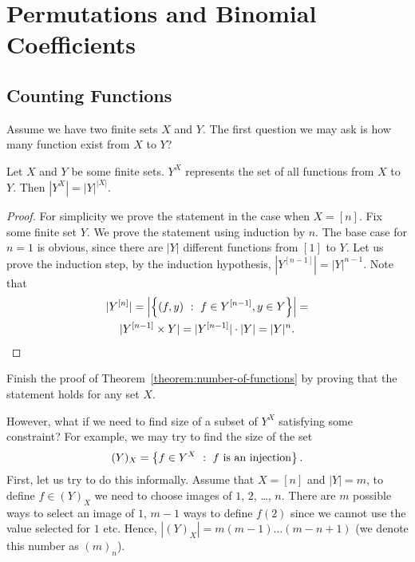 \chapter{Permutations and Binomial Coefficients}
\section{Counting Functions}
Assume we have two finite sets $X$ and $Y$. The first question we may ask is
how many function exist from $X$ to $Y$?


\begin{theorem}
\label{theorem:number-of-functions}
  Let $X$ and $Y$ be some finite sets. $Y^X$ represents the set of all
  functions from $X$ to $Y$. Then $|Y^X| = |Y|^{|X|}$.
\end{theorem}
\begin{proof}
  For simplicity we prove the statement in the case when $X = [n]$. Fix some
  finite set $Y$. We prove the statement using induction by $n$. The base case
  for $n = 1$ is obvious, since there are $|Y|$ different functions from $[1]$
  to $Y$. Let us prove the induction step, by the induction hypothesis,
  $|Y^{[n - 1]}| = |Y|^{n - 1}$. Note that
  \begin{multline*}
    |Y^{[n]}| = \left| \set[f \in Y^{[ n - 1]}, y \in Y]{(f, y)} \right| = \\
    |Y^{[n - 1]} \times Y| = |Y^{[n - 1]}| \cdot |Y| = |Y|^n.
  \end{multline*}
\end{proof}

\begin{exercise}
  Finish the proof of Theorem~\ref{theorem:number-of-functions} by proving that
  the statement holds for any set $X$.
\end{exercise}

However, what if we need to find size of a subset of $Y^X$ satisfying some
constraint? For example, we may try to find the size of the set
\[
  (Y)_X = \set[f\text{ is an injection}]{f \in Y^X}.
\]
First, let us try to do this informally. Assume that $X = [n]$ and $|Y| = m$,
to define $f \in (Y)_X$ we need to choose images of $1$, $2$, \dots, $n$. There
are $m$ possible ways to select an image of $1$, $m - 1$ ways to define $f(2)$
since we cannot use the value selected for $1$ etc. Hence,
$|(Y)_X| = m (m - 1) \dots (m - n + 1)$ (we denote this number as $(m)_n$).

